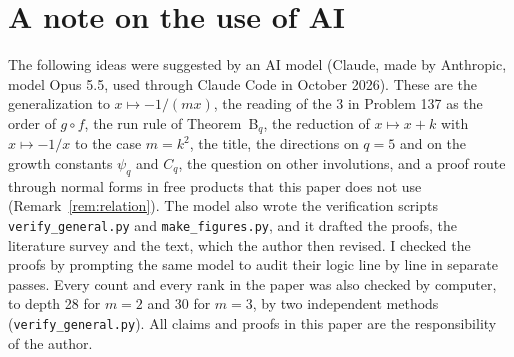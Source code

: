 \documentclass[11pt]{article}
\theoremstyle{definition}
\theoremstyle{remark}
\begin{document}
\section*{A note on the use of AI}
The following ideas were suggested by an AI model (Claude, made by Anthropic, model Opus 5.5, used
through Claude Code in October 2026). These are the generalization to $x\mapsto-1/(mx)$, the reading of
the $3$ in Problem 137 as the order of $g\circ f$, the run rule of Theorem~B$_q$, the reduction of
$x\mapsto x+k$ with $x\mapsto-1/x$ to the case $m=k^2$, the title, the directions on $q=5$ and on
the growth constants $\psi_q$ and $C_q$, the question on other involutions, and a proof route
through normal forms in free products that this paper does not use (Remark~\ref{rem:relation}). The
model also wrote the verification scripts \texttt{verify\_general.py} and \texttt{make\_figures.py},
and it drafted the proofs, the literature survey and the text, which the author then revised. I checked the proofs by prompting the same model
to audit their logic line by line in separate passes. Every count and every rank in the paper was
also checked by computer, to depth 28 for $m=2$ and 30 for $m=3$, by two independent methods
(\texttt{verify\_general.py}). All claims and proofs in this paper are the responsibility of the
author.


\end{document}
